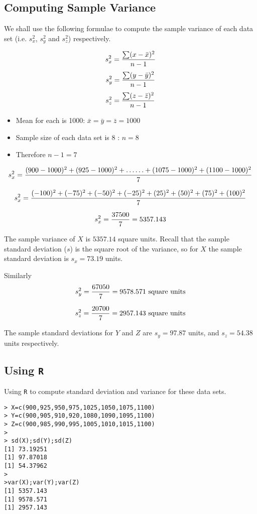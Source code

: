 \documentclass[a4paper,12pt]{article}
\begin{document}
{
\subsection*{Computing Sample Variance}
	We shall use the following formulae to compute the sample variance of each data set (i.e. $s^2_x$, $s^2_y$ and $s^2_z$) respectively.
	
	\[ s^2_x = { \sum (x-\bar{x})^2  \over n-1}\]
	\[ s^2_y = { \sum (y-\bar{y})^2  \over n-1}\]
	\[ s^2_z = { \sum (z-\bar{z})^2  \over n-1}\]
	\begin{itemize}
		\item Mean for each is 1000: $\bar{x} = \bar{y} = \bar{z}  = 1000$
		\item Sample size of each data set is 8 : $ n=8 $
		\item Therefore $ n-1 = 7$
	\end{itemize}


	\[ s^2_x = {(900-1000)^2 +(925-1000)^2+ \ldots \ldots +(1075-1000)^2+(1100-1000)^2   \over 7}\]
	
	\[ s^2_x = {(-100)^2 +(-75)^2 +(-50)^2+(-25)^2 + (25)^2 +(50)^2 +(75)^2+(100)^2   \over 7}\]
	
	\[ s^2_x = {37500 \over 7}  = 5357.143\]

	\bigskip 
	
\noindent The sample variance of $X$ is $5357.14$ square units. Recall that the sample standard deviation ($s$) is the square root of the variance, so for $X$  the sample standard deviation is $s_x = 73.19$ units.
	
	
	
\noindent Similarly 
	\[ s^2_y = {67050 \over 7}  = 9578.571 \mbox{ square units} \]
	
	\[ s^2_z = {20700  \over 7} = 2957.143 \mbox{ square units} \]
	
\noindent The sample standard deviations for $Y$ and $Z$ are $s_y = 97.87$ units, and $s_z =  54.38$ units respectively.
}

\subsection*{Using \texttt{R}}Using \texttt{R} to compute standard deviation and variance for these data sets.

\begin{framed}
\begin{verbatim}
> X=c(900,925,950,975,1025,1050,1075,1100)
> Y=c(900,905,910,920,1080,1090,1095,1100)
> Z=c(900,985,990,995,1005,1010,1015,1100)
>
> sd(X);sd(Y);sd(Z)
[1] 73.19251
[1] 97.87018
[1] 54.37962
> 
>var(X);var(Y);var(Z)
[1] 5357.143
[1] 9578.571
[1] 2957.143
\end{verbatim}
\end{framed}
\end{document}
